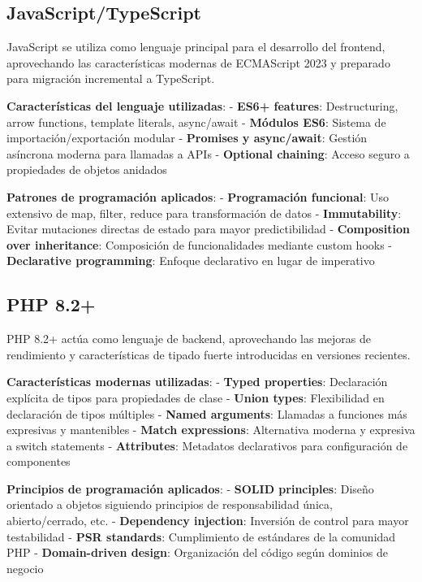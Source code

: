 \documentclass[12pt,a4paper,oneside]{report}
\begin{document}
\subsection{JavaScript/TypeScript}\label{javascripttypescript}

JavaScript se utiliza como lenguaje principal para el desarrollo del
frontend, aprovechando las características modernas de ECMAScript 2023 y
preparado para migración incremental a TypeScript.

\textbf{Características del lenguaje utilizadas}: - \textbf{ES6+
features}: Destructuring, arrow functions, template literals,
async/await - \textbf{Módulos ES6}: Sistema de importación/exportación
modular - \textbf{Promises y async/await}: Gestión asíncrona moderna
para llamadas a APIs - \textbf{Optional chaining}: Acceso seguro a
propiedades de objetos anidados

\textbf{Patrones de programación aplicados}: - \textbf{Programación
funcional}: Uso extensivo de map, filter, reduce para transformación de
datos - \textbf{Immutability}: Evitar mutaciones directas de estado para
mayor predictibilidad - \textbf{Composition over inheritance}:
Composición de funcionalidades mediante custom hooks -
\textbf{Declarative programming}: Enfoque declarativo en lugar de
imperativo

\subsection{PHP 8.2+}\label{php-8.2}

PHP 8.2+ actúa como lenguaje de backend, aprovechando las mejoras de
rendimiento y características de tipado fuerte introducidas en versiones
recientes.

\textbf{Características modernas utilizadas}: - \textbf{Typed
properties}: Declaración explícita de tipos para propiedades de clase -
\textbf{Union types}: Flexibilidad en declaración de tipos múltiples -
\textbf{Named arguments}: Llamadas a funciones más expresivas y
mantenibles - \textbf{Match expressions}: Alternativa moderna y
expresiva a switch statements - \textbf{Attributes}: Metadatos
declarativos para configuración de componentes

\textbf{Principios de programación aplicados}: - \textbf{SOLID
principles}: Diseño orientado a objetos siguiendo principios de
responsabilidad única, abierto/cerrado, etc. - \textbf{Dependency
injection}: Inversión de control para mayor testabilidad - \textbf{PSR
standards}: Cumplimiento de estándares de la comunidad PHP -
\textbf{Domain-driven design}: Organización del código según dominios de
negocio
\end{document}
